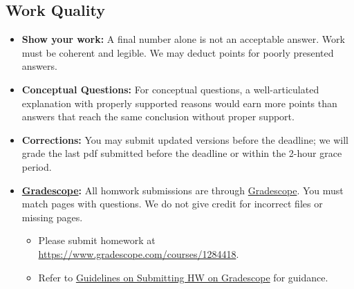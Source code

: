 \documentclass[11pt]{article}
\begin{document}
\subsection{Work Quality}
\begin{itemize}
    \item \textbf{Show your work:} A final number alone is not an acceptable answer. Work must be coherent and legible. We may deduct points for poorly presented answers.
    \item \textbf{Conceptual Questions:} For conceptual questions, a well-articulated explanation with properly supported reasons would earn more points than answers that reach the same conclusion without proper support.
    \item \textbf{Corrections:} You may submit updated versions before the deadline; we will grade the last pdf submitted before the deadline or within the 2-hour grace period.
    \item \textbf{\href{https://www.gradescope.com/courses/1284418}{Gradescope}:} All homwork submissions are through \href{https://www.gradescope.com/courses/1284418}{Gradescope}. You must match pages with questions. We do not give credit for incorrect files or missing pages.
    \begin{itemize}
        \item Please submit homework at \url{https://www.gradescope.com/courses/1284418}.
        \item Refer to \href{https://anirbanc96.github.io/stat-2000-spring-2026/gradescope/}{Guidelines on Submitting HW on Gradescope} for guidance.
    \end{itemize}
\end{itemize}
\end{document}
